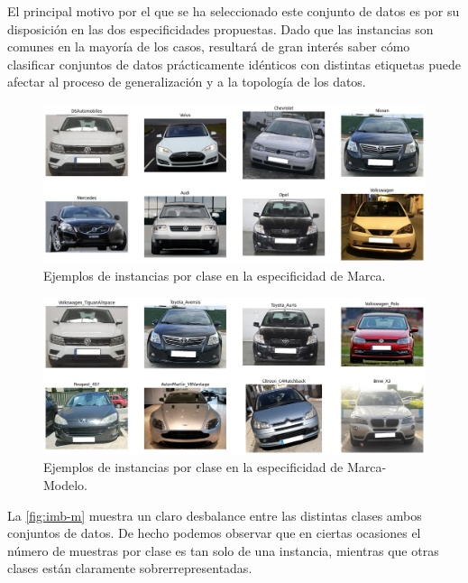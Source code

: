 El principal motivo por el que se ha seleccionado este conjunto de datos es por su
disposición en las dos especificidades propuestas. Dado que las instancias son
comunes en la mayoría de los casos, resultará de gran interés saber cómo clasificar
conjuntos de datos prácticamente idénticos con distintas etiquetas puede afectar
al proceso de generalización y a la topología de los datos.

\begin{figure}[h]
	\centering
	\includegraphics[width=120mm]{img/marca-example.png}
	\caption{Ejemplos de instancias por clase en la especificidad de Marca.}
	\label{fig:example-m}
\end{figure}

\begin{figure}[h]
	\centering
	\includegraphics[width=120mm]{img/marca-modelo-example.png}
	\caption{Ejemplos de instancias por clase en la especificidad de Marca-Modelo.}
	\label{fig:example-mm}
\end{figure}

La \autoref{fig:imb-m} muestra un claro desbalance entre las distintas clases ambos
conjuntos de datos. De hecho podemos observar que en ciertas ocasiones el número
de muestras por clase es tan solo de una instancia, mientras que otras clases están
claramente sobrerrepresentadas.

